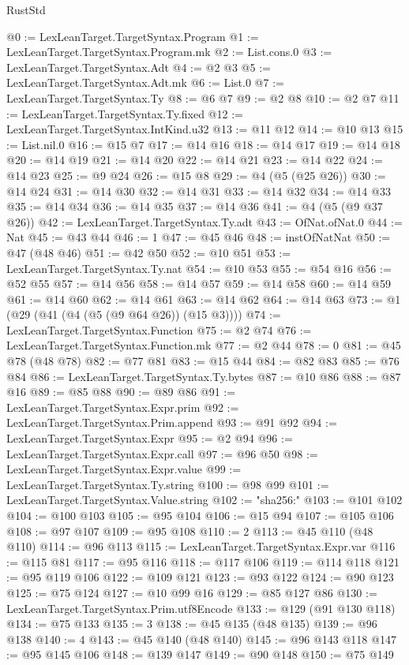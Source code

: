 \begin{lexlean}{RustStd}
\begin{coremodule}
@0 := LexLeanTarget.TargetSyntax.Program
@1 := LexLeanTarget.TargetSyntax.Program.mk
@2 := List.cons.{0}
@3 := LexLeanTarget.TargetSyntax.Adt
@4 := @2 @3
@5 := LexLeanTarget.TargetSyntax.Adt.mk
@6 := List.{0}
@7 := LexLeanTarget.TargetSyntax.Ty
@8 := @6 @7
@9 := @2 @8
@10 := @2 @7
@11 := LexLeanTarget.TargetSyntax.Ty.fixed
@12 := LexLeanTarget.TargetSyntax.IntKind.u32
@13 := @11 @12
@14 := @10 @13
@15 := List.nil.{0}
@16 := @15 @7
@17 := @14 @16
@18 := @14 @17
@19 := @14 @18
@20 := @14 @19
@21 := @14 @20
@22 := @14 @21
@23 := @14 @22
@24 := @14 @23
@25 := @9 @24
@26 := @15 @8
@29 := @4 (@5 (@25 @26))
@30 := @14 @24
@31 := @14 @30
@32 := @14 @31
@33 := @14 @32
@34 := @14 @33
@35 := @14 @34
@36 := @14 @35
@37 := @14 @36
@41 := @4 (@5 (@9 @37 @26))
@42 := LexLeanTarget.TargetSyntax.Ty.adt
@43 := OfNat.ofNat.{0}
@44 := Nat
@45 := @43 @44
@46 := 1
@47 := @45 @46
@48 := instOfNatNat
@50 := @47 (@48 @46)
@51 := @42 @50
@52 := @10 @51
@53 := LexLeanTarget.TargetSyntax.Ty.nat
@54 := @10 @53
@55 := @54 @16
@56 := @52 @55
@57 := @14 @56
@58 := @14 @57
@59 := @14 @58
@60 := @14 @59
@61 := @14 @60
@62 := @14 @61
@63 := @14 @62
@64 := @14 @63
@73 := @1 (@29 (@41 (@4 (@5 (@9 @64 @26)) (@15 @3))))
@74 := LexLeanTarget.TargetSyntax.Function
@75 := @2 @74
@76 := LexLeanTarget.TargetSyntax.Function.mk
@77 := @2 @44
@78 := 0
@81 := @45 @78 (@48 @78)
@82 := @77 @81
@83 := @15 @44
@84 := @82 @83
@85 := @76 @84
@86 := LexLeanTarget.TargetSyntax.Ty.bytes
@87 := @10 @86
@88 := @87 @16
@89 := @85 @88
@90 := @89 @86
@91 := LexLeanTarget.TargetSyntax.Expr.prim
@92 := LexLeanTarget.TargetSyntax.Prim.append
@93 := @91 @92
@94 := LexLeanTarget.TargetSyntax.Expr
@95 := @2 @94
@96 := LexLeanTarget.TargetSyntax.Expr.call
@97 := @96 @50
@98 := LexLeanTarget.TargetSyntax.Expr.value
@99 := LexLeanTarget.TargetSyntax.Ty.string
@100 := @98 @99
@101 := LexLeanTarget.TargetSyntax.Value.string
@102 := "sha256:"
@103 := @101 @102
@104 := @100 @103
@105 := @95 @104
@106 := @15 @94
@107 := @105 @106
@108 := @97 @107
@109 := @95 @108
@110 := 2
@113 := @45 @110 (@48 @110)
@114 := @96 @113
@115 := LexLeanTarget.TargetSyntax.Expr.var
@116 := @115 @81
@117 := @95 @116
@118 := @117 @106
@119 := @114 @118
@121 := @95 @119 @106
@122 := @109 @121
@123 := @93 @122
@124 := @90 @123
@125 := @75 @124
@127 := @10 @99 @16
@129 := @85 @127 @86
@130 := LexLeanTarget.TargetSyntax.Prim.utf8Encode
@133 := @129 (@91 @130 @118)
@134 := @75 @133
@135 := 3
@138 := @45 @135 (@48 @135)
@139 := @96 @138
@140 := 4
@143 := @45 @140 (@48 @140)
@145 := @96 @143 @118
@147 := @95 @145 @106
@148 := @139 @147
@149 := @90 @148
@150 := @75 @149

\end{coremodule}
\end{lexlean}
